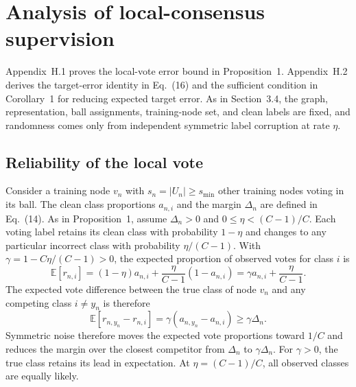 \documentclass[times,10pt]{elsarticle}
\begin{document}

\setcounter{table}{0}
\section{Analysis of local-consensus supervision}\label{sec:H}
\setcounter{equation}{0}
\renewcommand{\theequation}{H.\arabic{equation}}
\renewcommand{\theHequation}{H.\arabic{equation}}

Appendix~H.1 proves the local-vote error bound in Proposition~1. Appendix~H.2 derives the target-error identity in Eq.~(16) and the sufficient condition in Corollary~1 for reducing expected target error. As in Section~3.4, the graph, representation, ball assignments, training-node set, and clean labels are fixed, and randomness comes only from independent symmetric label corruption at rate \(\eta\).

\subsection{Reliability of the local vote}\label{sec:H.1}

Consider a training node \(v_n\) with \(s_n=|U_n|\geq s_{\min}\) other training nodes voting in its ball. The clean class proportions \(a_{n,i}\) and the margin \(\Delta_n\) are defined in Eq.~(14). As in Proposition~1, assume \(\Delta_n>0\) and \(0\leq\eta<(C-1)/C\). Each voting label retains its clean class with probability \(1-\eta\) and changes to any particular incorrect class with probability \(\eta/(C-1)\). With \(\gamma=1-C\eta/(C-1)>0\), the expected proportion of observed votes for class \(i\) is
\begin{equation}\label{eq:H.1}
\mathbb{E}[r_{n,i}]=(1-\eta)a_{n,i}
+\frac{\eta}{C-1}(1-a_{n,i})
=\gamma a_{n,i}+\frac{\eta}{C-1}.
\end{equation}
The expected vote difference between the true class of node \(v_n\) and any competing class \(i\ne y_n\) is therefore
\begin{equation}\label{eq:H.2}
\mathbb{E}[r_{n,y_n}-r_{n,i}]
=\gamma(a_{n,y_n}-a_{n,i})\geq\gamma\Delta_n.
\end{equation}
Symmetric noise therefore moves the expected vote proportions toward \(1/C\) and reduces the margin over the closest competitor from \(\Delta_n\) to \(\gamma\Delta_n\). For \(\gamma>0\), the true class retains its lead in expectation. At \(\eta=(C-1)/C\), all observed classes are equally likely.
\end{document}
